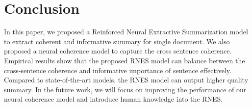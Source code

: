 \documentclass[letterpaper]{article} %
\begin{document}
	
	
	\section{Conclusion}	
	In this paper, we proposed a Reinforced Neural Extractive Summarization model to extract coherent and informative summary for single document. We also proposed a neural coherence model to capture the cross sentence coherence. Empirical results show that the proposed RNES model can balance between the cross-sentence coherence and informative importance of sentence effectively. Compared to state-of-the-art models, the RNES model can output higher quality summary. In the future work, we will focus on improving the performance of our neural coherence model and introduce human knowledge into the RNES.  
	
	\clearpage
	
	
	
\end{document}

